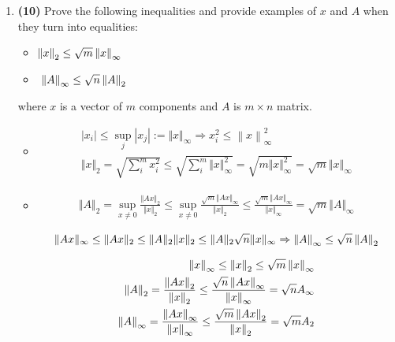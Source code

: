 \begin{enumerate}
\item \textbf{(10)} Prove the following inequalities and provide examples of $x$ and $A$ when they turn into equalities:
\begin{itemize}
\item $\left\lVert x\right\rVert_2 \le \sqrt{m}\left\lVert x\right\rVert_\infty$
\item $\
\left\lVert A\right\rVert_\infty \le \sqrt{n} \left\lVert A\right\rVert_2$
\end{itemize}
where $x$ is a vector of $m$ components and $A$ is $m\times n$ matrix.

\begin{solution}
    \begin{itemize}
        \item \begin{eqnarray*}
            |x_{i}| \leq \sup_{j} |x_{j}| := \Vert x\Vert_{\infty} \Rightarrow x^2_{i} \leq \left\lVert x\right\rVert^{2}_{\infty} \\
            \Vert x \Vert_{2}  = \sqrt{\sum_{i}^{m} x^{2}_i} \leq  \sqrt{\sum_{i}^{m} \Vert x \Vert_{\infty}^2} = \sqrt{m \Vert x \Vert_{\infty}^2 } =  \sqrt{m}\Vert x \Vert_{\infty}
        \end{eqnarray*}

        \item \begin{eqnarray*}
            \Vert A \Vert_{2} = \sup_{x \ne 0} \frac{\Vert A x \Vert_2}{\Vert x \Vert_2} 
            \leq \sup_{x \ne 0} \frac{\sqrt{m}\Vert A x \Vert_{\infty}}{\Vert x \Vert_2}
            \leq \frac{\sqrt{m}\Vert A x \Vert_{\infty}}{\Vert x \Vert_{\infty}}
            =  \sqrt{m} \Vert A \Vert_{\infty}
        \end{eqnarray*}

        \begin{eqnarray*}
            \Vert Ax\Vert_\infty\leq\Vert Ax\Vert_2\leq\Vert A\Vert_2\Vert x\Vert_2\leq\Vert A\Vert_2\sqrt{n}\Vert x\Vert_\infty \Rightarrow \left\lVert A\right\rVert_\infty \le \sqrt{n} \left\lVert A\right\rVert_2
        \end{eqnarray*}

        \begin{eqnarray*}
            \left\lVert x\right\rVert_{\infty} \leq \left\lVert x\right\rVert_{2} \leq \sqrt{m} \left\lVert x\right\rVert_{\infty} \\
            \left\lVert A\right\rVert_{2} = \frac{\left\lVert Ax\right\rVert_{2}}{\left\lVert x\right\rVert_{2}} \leq \frac{\sqrt{n} \left\lVert Ax\right\rVert_{\infty}}{\left\lVert x\right\rVert_{\infty}} =  \sqrt{n} A_{\infty} \\
            \left\lVert A\right\rVert_{\infty} = \frac{\left\lVert Ax\right\rVert_{\infty}}{\left\lVert x\right\rVert_{\infty}} \leq \frac{\sqrt{m} \left\lVert Ax\right\rVert_{2}}{\left\lVert x\right\rVert_{2}} =  \sqrt{m} A_{2} \\
        \end{eqnarray*}
    \end{itemize}
\end{solution}



\end{enumerate}
